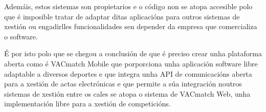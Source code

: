   Ademáis, estos sistemas son propietarios e o código non se atopa accesible 
polo que é imposible tratar de adaptar ditas aplicacións para outros 
sistemas de xestión ou engadirlles funcionalidades sen depender da empresa 
que comercializa o software.

  É por isto polo que se chegou a conclusión de que é preciso crear unha 
plataforma aberta como é VACmatch Mobile que porporciona unha aplicación 
software libre adaptable a diversos deportes e que integra unha API de 
comunicacións aberta para a xestión de actas electrónicas e que permite a súa 
integración noutros sistemas de xestión entre os cales se atopa o sistema de 
VACmatch Web, unha implementación libre para a xestión de competicións.


